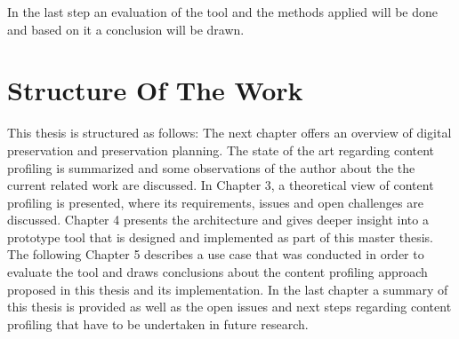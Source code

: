 In the last step an evaluation of the tool and the methods applied will be done and based on it a conclusion will be drawn.

\section{Structure Of The Work}
\label{sec:structure_of_the_work}
This thesis is structured as follows: The next chapter offers an overview of digital preservation and preservation planning. The state of the art regarding content profiling is summarized and some observations of the author about the the current related work are discussed. In Chapter 3, a theoretical view of content profiling is presented, where its requirements, issues and open challenges are discussed. Chapter 4 presents the architecture and gives deeper insight into a prototype tool that is designed and implemented as part of this master thesis. The following Chapter 5 describes a use case that was conducted in order to evaluate the tool and draws conclusions about the content profiling approach proposed in this thesis and its implementation. In the last chapter a summary of this thesis is provided as well as the open issues and next steps regarding content profiling that have to be undertaken in future research.